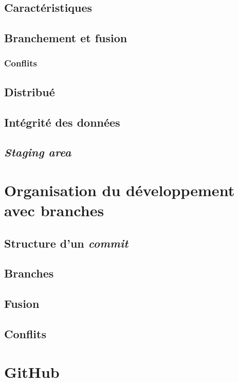 \documentclass[11pt,a4paper]{article}
\begin{document}
\subsection{Caractéristiques}

\subsection{Branchement et fusion}

\subsubsection{Conflits}

\subsection{Distribué}

\subsection{Intégrité des données}

\subsection{\textit{Staging area}}

\pagebreak
\section{Organisation du développement avec branches}

\subsection{Structure d'un \textit{commit}}

\subsection{Branches}

\subsection{Fusion}

\subsection{Conflits}

\pagebreak
\section{GitHub}
\end{document}
